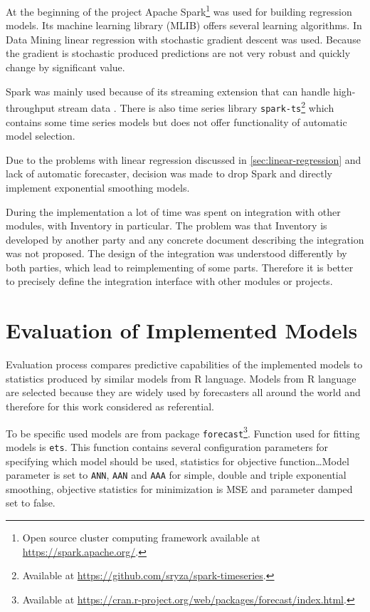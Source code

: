     At the beginning of the project Apache Spark\footnote{Open source cluster computing framework available at
    \url{https://spark.apache.org/}.} was used for building regression models. Its machine learning library (MLIB)
    offers several learning algorithms. In Data Mining linear regression with stochastic gradient descent was used.
    Because the gradient is stochastic produced predictions are not very robust and quickly change by significant value.

    Spark was mainly used because of its streaming extension that can handle
    high-throughput stream data \cite{apache-spark}. There is also time series library
    \texttt{spark-ts}\footnote{Available at \url{https://github.com/sryza/spark-timeseries}.} which contains some
    time series models but does not offer functionality of automatic model selection.

    Due to the problems with linear regression discussed in \ref{sec:linear-regression} and lack of automatic
    forecaster, decision was made to drop Spark and directly implement exponential smoothing models.

    During the implementation a lot of time was spent on integration with other modules, with Inventory in particular.
    The problem was that Inventory is developed by another party and any concrete document
    describing the integration was not proposed. The design of the integration was understood differently
    by both parties, which lead to reimplementing of some parts. Therefore it is better to precisely define the
    integration interface with other modules or projects.

\chapter{Evaluation of Implemented Models} \label{chap:evaluation}
Evaluation process compares predictive capabilities of the implemented models to statistics produced by similar models
from R language. Models from R language are selected because they are widely used by forecasters all around the
world and therefore for this work considered as referential.

To be specific used models are from package
\texttt{forecast}\footnote{Available at \url{https://cran.r-project.org/web/packages/forecast/index.html}.}.
Function used for fitting models is \texttt{ets}. This function contains several configuration parameters for
specifying which model should be used, statistics for objective function\dots Model parameter is set to
\texttt{ANN}, \texttt{AAN} and \texttt{AAA} for simple, double and triple exponential smoothing, objective statistics
for minimization is MSE and parameter damped set to false.


